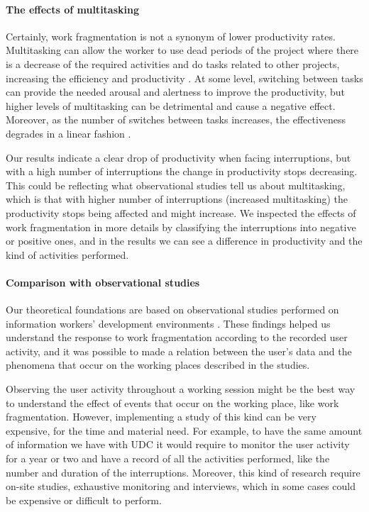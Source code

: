 \documentclass[times]{smrauth}
\begin{document}
\paragraph{The effects of multitasking}
Certainly, work fragmentation is not a synonym of lower productivity rates. Multitasking can allow the worker to use dead periods of the project where there is a decrease of the required activities and do tasks related to other projects, increasing the efficiency and productivity \cite{ABV12}. At some level, switching between tasks can provide the needed arousal and alertness to improve the productivity, but higher levels of multitasking can be detrimental and cause a negative effect. Moreover, as the number of switches between tasks increases, the effectiveness degrades in a linear fashion \cite{AB12}. 

Our results indicate a clear drop of productivity when facing interruptions, but with a high number of interruptions the change in productivity stops decreasing. This could be reflecting what observational studies tell us about multitasking, which is that with higher number of interruptions (increased multitasking) the productivity stops being affected and might increase. %
We inspected  the effects of work fragmentation in more details by classifying the interruptions into negative or positive ones, and in the results we can see a difference in productivity and the kind of activities performed.

\paragraph{Comparison with observational studies}
Our theoretical foundations are based on observational studies performed on information workers' development environments \cite{MGH05, IH07, LVD06, PD10}. These findings helped us understand the response to work fragmentation according to the recorded user activity, and it was possible to made a relation between the user's data and the phenomena that occur on the working places described in the studies.

Observing the user activity throughout a working session might be the best way to understand the effect of events that occur on the working place, like work fragmentation. However, implementing a study of this kind can be very expensive, for the time and material need. For example, to have the same amount of information we have with UDC it would require to monitor the user activity for a year or two and have a record of all the activities performed, like the number and duration of the interruptions. Moreover, this kind of research require on-site studies, exhaustive monitoring and interviews, which in some cases could be expensive or difficult to perform.
\end{document}
